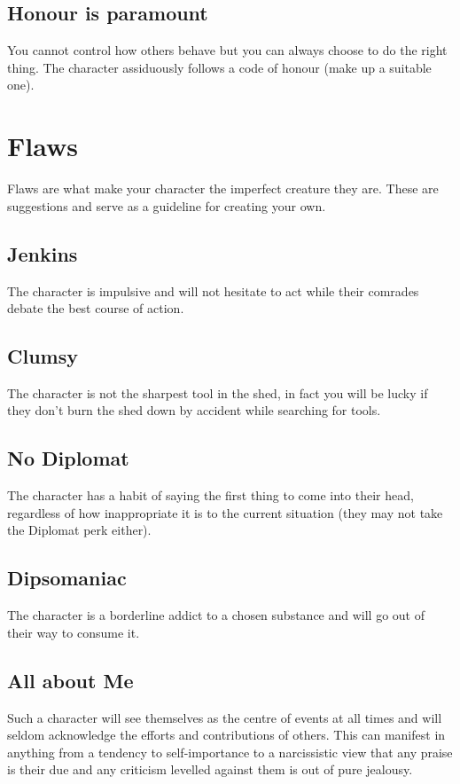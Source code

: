 \documentclass[a4paper,10pt,oneside]{book}
\begin{document}
\subsection{Honour is paramount}
You cannot control how others behave but you can always choose to do the right thing. The character assiduously follows a code of honour (make up a suitable one).



\section{Flaws}
\label{sec:flaws}
Flaws are what make your character the imperfect creature they are. These are suggestions and serve as a guideline for creating your own.

\subsection{Jenkins}
The character is impulsive and will not hesitate to act while their comrades debate the best course of action.

\subsection{Clumsy}
The character is not the sharpest tool in the shed, in fact you will be lucky if they don't burn the shed down by accident while searching for tools.

\subsection{No Diplomat}
The character has a habit of saying the first thing to come into their head, regardless of how inappropriate it is to the current situation (they may not take the Diplomat perk either).

\subsection{Dipsomaniac}
The character is a borderline addict to a chosen substance and will go out of their way to consume it.

\subsection{All about Me}
Such a character will see themselves as the centre of events at all times and will seldom acknowledge the efforts and contributions of others. This can manifest in anything from a tendency to self-importance to a narcissistic view that any praise is their due and any criticism levelled against them is out of pure jealousy. 
\end{document}
